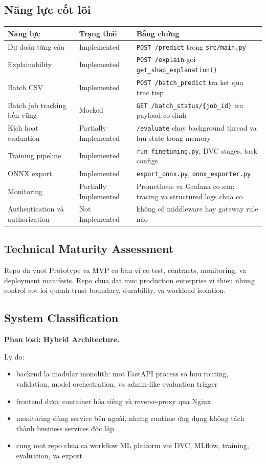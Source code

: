 \subsection{Năng lực cốt lõi}
\begin{table}[H]
\centering
\begin{tabularx}{\textwidth}{@{}l l X@{}}
\toprule
\textbf{Năng lực} & \textbf{Trạng thái} & \textbf{Bằng chứng} \\
\midrule
Dự đoán từng câu & Implemented & \texttt{POST /predict} trong \texttt{src/main.py} \\
Explainability & Implemented & \texttt{POST /explain} goi \texttt{get\_shap\_explanation()} \\
Batch CSV & Implemented & \texttt{POST /batch\_predict} tra ket qua truc tiep \\
Batch job tracking bền vững & Mocked & \texttt{GET /batch\_status/\{job\_id\}} tra payload co dinh \\
Kích hoạt evaluation & Partially Implemented & \texttt{/evaluate} chay background thread va luu state trong memory \\
Training pipeline & Implemented & \texttt{run\_finetuning.py}, DVC stages, task configs \\
ONNX export & Implemented & \texttt{export\_onnx.py}, \texttt{onnx\_exporter.py} \\
Monitoring & Partially Implemented & Prometheus va Grafana co san; tracing va structured logs chua co \\
Authentication và authorization & Not Implemented & không có middleware hay gateway rule nào \\
\bottomrule
\end{tabularx}
\end{table}

\subsection{Technical Maturity Assessment}
Repo da vuot Prototype va MVP co ban vi co test, contracts, monitoring, va deployment manifests. Repo chua dat muc production enterprise vi thieu nhung control cot loi quanh trust boundary, durability, va workload isolation.

\subsection{System Classification}
\textbf{Phan loai: Hybrid Architecture.}

Ly do:
\begin{itemize}[leftmargin=1.2em]
  \item backend la modular monolith: mot FastAPI process so huu routing, validation, model orchestration, va admin-like evaluation trigger
  \item frontend được container hóa riêng và reverse-proxy qua Nginx
  \item monitoring dùng service bên ngoài, nhưng runtime ứng dụng không tách thành business services độc lập
  \item cung mot repo chua ca workflow ML platform voi DVC, MLflow, training, evaluation, va export
\end{itemize}

